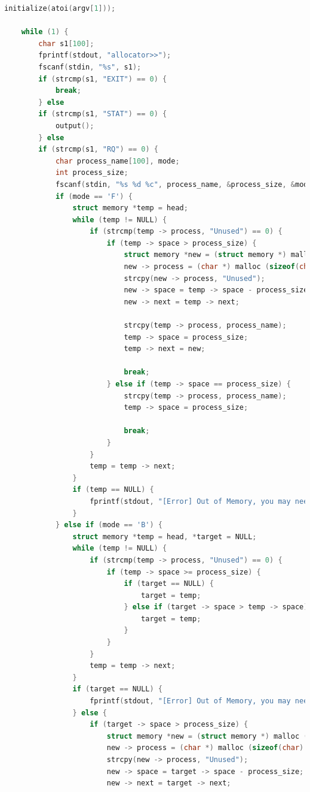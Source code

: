 \documentclass[UTF8,10pt,a4paper]{article}
\theoremstyle{Problem}
\theoremstyle{Solution}
\begin{document}
\begin{lstlisting}[language = c ]
    initialize(atoi(argv[1]));

    while (1) {
        char s1[100];
        fprintf(stdout, "allocator>>");
        fscanf(stdin, "%s", s1);
        if (strcmp(s1, "EXIT") == 0) {
            break;
        } else
        if (strcmp(s1, "STAT") == 0) {
            output();
        } else 
        if (strcmp(s1, "RQ") == 0) {
            char process_name[100], mode;
            int process_size;
            fscanf(stdin, "%s %d %c", process_name, &process_size, &mode);
            if (mode == 'F') {
                struct memory *temp = head;
                while (temp != NULL) {
                    if (strcmp(temp -> process, "Unused") == 0) {
                        if (temp -> space > process_size) {
                            struct memory *new = (struct memory *) malloc (sizeof(struct memory));
                            new -> process = (char *) malloc (sizeof(char) * 20);
                            strcpy(new -> process, "Unused");
                            new -> space = temp -> space - process_size;
                            new -> next = temp -> next;

                            strcpy(temp -> process, process_name);
                            temp -> space = process_size;
                            temp -> next = new;
                            
                            break;
                        } else if (temp -> space == process_size) {
                            strcpy(temp -> process, process_name);
                            temp -> space = process_size;

                            break;
                        }
                    }
                    temp = temp -> next;
                }
                if (temp == NULL) {
                    fprintf(stdout, "[Error] Out of Memory, you may need to compact!! \n");
                }
            } else if (mode == 'B') {
                struct memory *temp = head, *target = NULL;
                while (temp != NULL) {
                    if (strcmp(temp -> process, "Unused") == 0) {
                        if (temp -> space >= process_size) {
                            if (target == NULL) {
                                target = temp;
                            } else if (target -> space > temp -> space) {
                                target = temp;
                            }
                        }
                    }
                    temp = temp -> next;
                }
                if (target == NULL) {
                    fprintf(stdout, "[Error] Out of Memory, you may need to compact!! \n");
                } else {
                    if (target -> space > process_size) {
                        struct memory *new = (struct memory *) malloc (sizeof(struct memory));
                        new -> process = (char *) malloc (sizeof(char) * 20);
                        strcpy(new -> process, "Unused");
                        new -> space = target -> space - process_size;
                        new -> next = target -> next;


\end{lstlisting}
\end{document}
